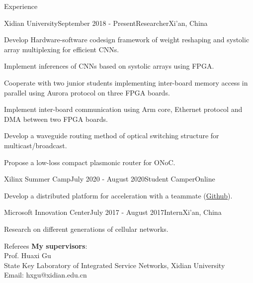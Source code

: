 \documentclass{resume} %
\begin{document}
\begin{rSection}{Experience}
	
	\begin{rSubsection}{Xidian University}{September 2018 - Present}{Researcher}{Xi'an, China}
	\item Develop Hardware-software codesign framework of weight reshaping and systolic array multiplexing for efficient CNNs.
	\item Implement inferences of CNNs based on systolic arrays using FPGA.
	\item Cooperate with two junior students implementing inter-board memory access in parallel using Aurora protocol on three FPGA boards.
	\item Implement inter-board communication using Arm core, Ethernet protocol and DMA between two FPGA boards.
	\item Develop a waveguide routing method of optical switching structure for multicast/broadcast.
	\item Propose a low-loss compact plasmonic router for ONoC.
    \end{rSubsection}	
	
	\begin{rSubsection}{Xilinx Summer Camp}{July 2020 - August 2020}{Student Camper}{Online}
		\item Develop a distributed platform for acceleration with a teammate (\href{https://github.com/Ssicayoon/XSC_Distributed_Platform_for_Acceleration}{Github}).
	\end{rSubsection}

	\begin{rSubsection}{Microsoft Innovation Center}{July 2017 - August 2017}{Intern}{Xi'an, China}
		\item Research on different generations of cellular networks.
	\end{rSubsection}

\end{rSection}


\begin{rSection}{Referees}
	{\bf My supervisors}: \\
	Prof. Huaxi Gu \\
	State Key Laboratory of Integrated Service Networks, Xidian University \\
	Email: hxgu@xidian.edu.cn

\end{rSection}
\end{document}
